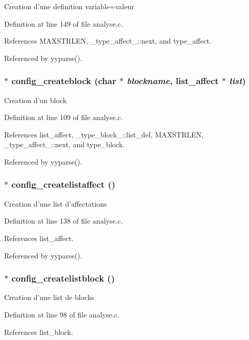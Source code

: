 Creation d'une definition variable=valeur 

Definition at line 149 of file analyse.c.

References MAXSTRLEN, \_\-type\_\-affect\_\-::next, and type\_\-affect.

Referenced by yyparse().
\subsubsection{$\ast$ config\_\-createblock (char $\ast$ {\em blockname}, {\bf list\_\-affect} $\ast$ {\em list})}\label{analyse_8h_a6}


Creation d'un block 

Definition at line 109 of file analyse.c.

References list\_\-affect, \_\-type\_\-block\_\-::list\_\-def, MAXSTRLEN, \_\-type\_\-affect\_\-::next, and type\_\-block.

Referenced by yyparse().
\subsubsection{$\ast$ config\_\-createlistaffect ()}\label{analyse_8h_a8}


Creation d'une list d'affectations 

Definition at line 138 of file analyse.c.

References list\_\-affect.

Referenced by yyparse().
\subsubsection{$\ast$ config\_\-createlistblock ()}\label{analyse_8h_a5}


Creation d'une list de blocks 

Definition at line 98 of file analyse.c.

References list\_\-block.


